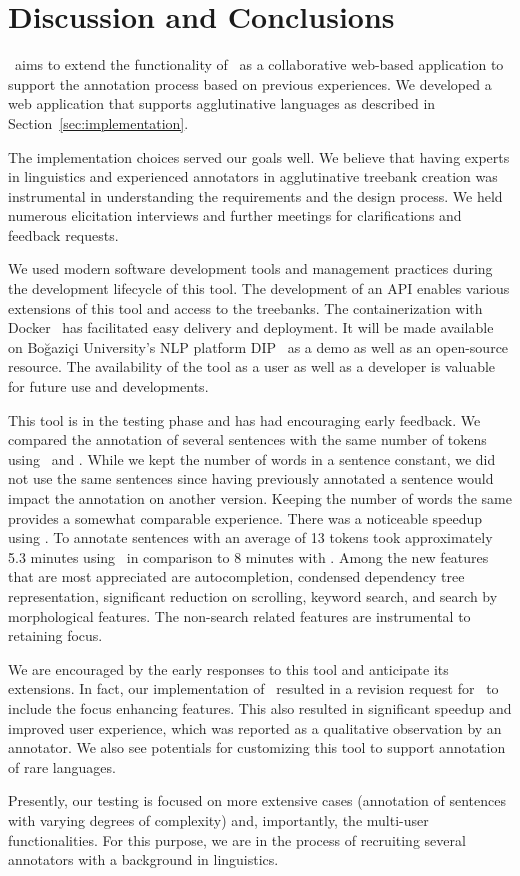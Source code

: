 \section{Discussion and Conclusions}
\label{sec:discussion}

\boatvtwo\ aims to extend the functionality of \boatvone\ as a collaborative web-based application to support the annotation process based on previous experiences.
We developed a web application that supports agglutinative languages as described in Section~\ref{sec:implementation}.

The implementation choices served our goals well.
We believe that having experts in linguistics and experienced annotators in agglutinative treebank creation was instrumental in understanding the requirements and the design process.
We held numerous elicitation interviews and further meetings for clarifications and feedback requests.

We used modern software development tools and management practices during the development lifecycle of this tool.
The development of an API enables various extensions of this tool and access to the treebanks.
The containerization with Docker~\cite{docker} has facilitated easy delivery and deployment.
It will be made available on Boğaziçi University's NLP platform DIP~\cite{DIP} as a demo as well as an open-source resource.
The availability of the tool as a user as well as a developer is valuable for future use and developments.

This tool is in the testing phase and has had encouraging early feedback.
We compared the annotation of several sentences with the same number of tokens using \boatvone\ and \boatvtwo.
While we kept the number of words in a sentence constant, we did not use the same sentences since having previously annotated a sentence would impact the annotation on another version.
Keeping the number of words the same provides a somewhat comparable experience.
There was a noticeable speedup using \boatvtwo.
To annotate sentences with an average of 13 tokens took approximately 5.3 minutes using \boatvtwo\ in comparison to 8 minutes with \boatvone.
Among the new features that are most appreciated are autocompletion, condensed dependency tree representation, significant reduction on scrolling, keyword search, and search by morphological features.
The non-search related features are instrumental to retaining focus.

We are encouraged by the early responses to this tool and anticipate its extensions.
In fact, our implementation of \boatvtwo\ resulted in a revision request for \boatvone\ to include the focus enhancing features.
This also resulted in significant speedup and improved user experience, which was reported as a qualitative observation by an annotator.
We also see potentials for customizing this tool to support annotation of rare languages.

Presently, our testing is focused on more extensive cases (annotation of sentences with varying degrees of complexity) and, importantly, the multi-user functionalities.
For this purpose, we are in the process of recruiting several annotators with a background in linguistics.
